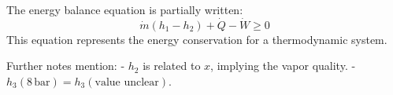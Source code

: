The energy balance equation is partially written:  
\[
\dot{m} (h_1 - h_2) + \dot{Q} - \dot{W} \geq 0
\]  
This equation represents the energy conservation for a thermodynamic system.  

Further notes mention:  
- \(h_2\) is related to \(x\), implying the vapor quality.  
- \(h_3 (8 \, \text{bar}) = h_3 (\text{value unclear})\).